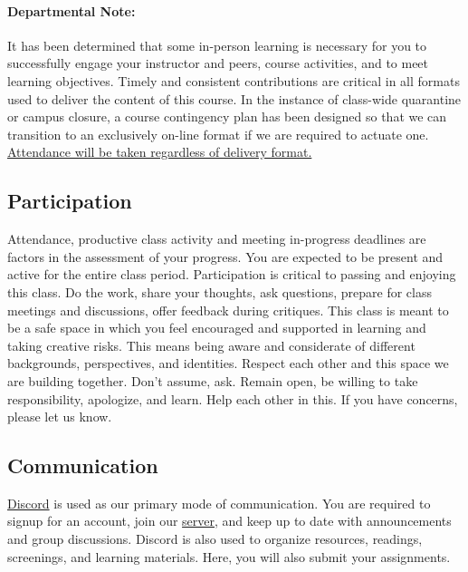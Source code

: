 \documentclass[12pt,letter,english]{report}
\begin{document}
\paragraph{Departmental Note:} It has been determined that some in-person learning is necessary for you to successfully engage your instructor and peers, course activities, and to meet learning objectives. Timely and consistent contributions are critical in all formats used to deliver the content of this course. In the instance of class-wide quarantine or campus closure, a course contingency plan has been designed so that we can transition to an exclusively on-line format if we are required to actuate one. \ul{Attendance will be taken regardless of delivery format.}


\subsection{Participation}

Attendance, productive class activity and meeting in-progress deadlines are factors in the assessment of your progress. You are expected to be present and active for the entire class period. Participation is critical to passing and enjoying this class. Do the work, share your thoughts, ask questions, prepare for class meetings and discussions, offer feedback during critiques. This class is meant to be a safe space in which you feel encouraged and supported in learning and taking creative risks. This means being aware and considerate of different backgrounds, perspectives, and identities. Respect each other and this space we are building together. Don’t assume, ask. Remain open, be willing to take responsibility, apologize, and learn. Help each other in this. If you have concerns, please let us know.

\hypertarget{communication}{%
      \subsection{Communication}\label{communication}}

\href{http://discordapp.com/}{Discord} is used as our primary mode of communication. You are required to signup for an account, join our \href{https://discord.gg/urXaaaY}{server}, and keep up to date with announcements and group discussions. Discord is also used to organize resources, readings, screenings, and learning materials. Here, you will also submit your assignments.
\end{document}
